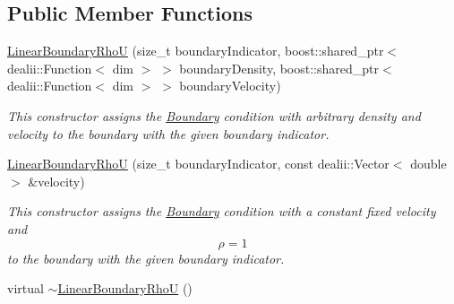 \subsection*{Public Member Functions}
\begin{DoxyCompactItemize}
\item 
\hyperlink{classnatrium_1_1LinearBoundaryRhoU_a72588bbed7cb004e02aaa562083a5527}{LinearBoundaryRhoU} (size\_\-t boundaryIndicator, boost::shared\_\-ptr$<$ dealii::Function$<$ dim $>$ $>$ boundaryDensity, boost::shared\_\-ptr$<$ dealii::Function$<$ dim $>$ $>$ boundaryVelocity)
\begin{DoxyCompactList}\small\item\em This constructor assigns the \hyperlink{classnatrium_1_1Boundary}{Boundary} condition with arbitrary density and velocity to the boundary with the given boundary indicator. \item\end{DoxyCompactList}\item 
\hyperlink{classnatrium_1_1LinearBoundaryRhoU_aefca829931a4c3e9c3f65e5889533c45}{LinearBoundaryRhoU} (size\_\-t boundaryIndicator, const dealii::Vector$<$ double $>$ \&velocity)
\begin{DoxyCompactList}\small\item\em This constructor assigns the \hyperlink{classnatrium_1_1Boundary}{Boundary} condition with a constant fixed velocity and \[ \rho = 1 \] to the boundary with the given boundary indicator. \item\end{DoxyCompactList}\item 
\hypertarget{classnatrium_1_1LinearBoundaryRhoU_a223e9b3e61033bcb30a3ad2a9d8994ea}{
virtual \hyperlink{classnatrium_1_1LinearBoundaryRhoU_a223e9b3e61033bcb30a3ad2a9d8994ea}{$\sim$LinearBoundaryRhoU} ()}
\label{classnatrium_1_1LinearBoundaryRhoU_a223e9b3e61033bcb30a3ad2a9d8994ea}


\end{DoxyCompactItemize}
